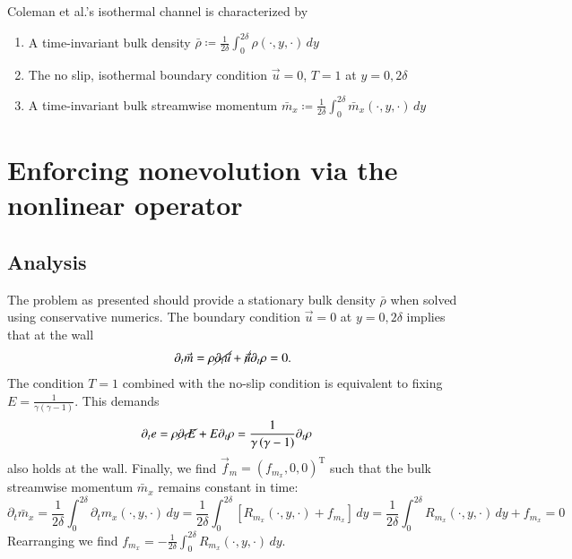 \documentclass[letterpaper,11pt,nointlimits,reqno]{amsart}
\begin{document}
Coleman et al.'s isothermal channel is characterized by
\begin{enumerate}
  \item A time-invariant bulk density $\bar{\rho} \coloneqq \frac{1}{2\delta}
        \int_{0}^{2\delta} \rho\!\left(\cdot,y,\cdot\right)\,dy $
  \item The no slip, isothermal boundary condition
        $\vec{u}=0$, $T = 1$ at $y = 0,2\delta$
  \item A time-invariant bulk streamwise momentum
        $\bar{m}_{x} \coloneqq \frac{1}{2\delta}
        \int_{0}^{2\delta} \bar{m}_{x}\!\left(\cdot,y,\cdot\right)\,dy $
\end{enumerate}


\section{Enforcing nonevolution via the nonlinear operator}

\subsection{Analysis}

The problem as presented should provide a stationary bulk density $\bar{\rho}$
when solved using conservative numerics.  The boundary condition $\vec{u} = 0$
at $y = 0,2\delta$ implies that at the wall
\begin{align}
  \partial_{t} \vec{m}
  =   \rho \cancel{\partial_{t} \vec{u}}
    + \cancel{\vec{u}} \partial_{t} \rho
  = 0.
\end{align}
The condition $T=1$ combined with the no-slip condition is equivalent to fixing
${E}=\frac{1}{\gamma\left(\gamma-1\right)}$.  This demands
\begin{align}
  \partial_{t} e
  &=  \rho \cancel{\partial_{t} {E}}
    + {E} \partial_{t} \rho
  = \frac{1}{\gamma\left(\gamma-1\right)} \partial_{t} \rho
\end{align}
also holds at the wall.  Finally, we find $\vec{f}_{m} =
\left(f_{m_x},0,0\right)^{\textrm{T}}$ such that the bulk streamwise momentum
$\bar{m}_{x}$ remains constant in time:
\begin{equation}
  \partial_{t} \bar{m}_x
   = \frac{1}{2\delta} \int_{0}^{2\delta}
     \partial_{t} m_{x} \!\left(\cdot,y,\cdot\right) \, dy
   = \frac{1}{2\delta} \int_{0}^{2\delta}
     \left[  R_{m_x}\!\left(\cdot,y,\cdot\right) + f_{m_x} \right] \, dy
   = \frac{1}{2\delta} \int_{0}^{2\delta}
     R_{m_x}\!\left(\cdot,y,\cdot\right) \, dy + f_{m_x}
   = 0
\end{equation}
Rearranging we find $f_{m_x} = - \frac{1}{2\delta}
\int_{0}^{2\delta} R_{m_x}\!\left(\cdot,y,\cdot\right) \, dy$.
\end{document}
